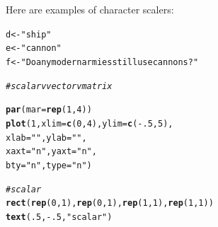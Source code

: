 \documentclass{tufte-book}\usepackage[]{graphicx}\usepackage[]{color}
\makeatletter
\newcommand{\hlnum}[1]{\textcolor[rgb]{0.686,0.059,0.569}{#1}}%
\newcommand{\hlstr}[1]{\textcolor[rgb]{0.192,0.494,0.8}{#1}}%
\newcommand{\hlcom}[1]{\textcolor[rgb]{0.678,0.584,0.686}{\textit{#1}}}%
\newcommand{\hlopt}[1]{\textcolor[rgb]{0,0,0}{#1}}%
\newcommand{\hlstd}[1]{\textcolor[rgb]{0.345,0.345,0.345}{#1}}%
\newcommand{\hlkwb}[1]{\textcolor[rgb]{0.69,0.353,0.396}{#1}}%
\newcommand{\hlkwc}[1]{\textcolor[rgb]{0.333,0.667,0.333}{#1}}%
\newcommand{\hlkwd}[1]{\textcolor[rgb]{0.737,0.353,0.396}{\textbf{#1}}}%
\newenvironment{kframe}{%
 \def\at@end@of@kframe{}%
 \ifinner\ifhmode%
  \def\at@end@of@kframe{\end{minipage}}%
  \begin{minipage}{\columnwidth}%
 \fi\fi%
 \def\FrameCommand##1{\hskip\@totalleftmargin \hskip-\fboxsep
 \colorbox{shadecolor}{##1}\hskip-\fboxsep
     \hskip-\linewidth \hskip-\@totalleftmargin \hskip\columnwidth}%
 \MakeFramed {\advance\hsize-\width
   \@totalleftmargin\z@ \linewidth\hsize
   \@setminipage}}%
 {\par\unskip\endMakeFramed%
 \at@end@of@kframe}
\newenvironment{knitrout}{}{} %
\makeatother
\begin{document}
Here are examples of character scalers:

\begin{knitrout}
\color{fgcolor}\begin{kframe}
\begin{alltt}
\hlstd{d} \hlkwb{<-} \hlstr{"ship"}
\hlstd{e} \hlkwb{<-} \hlstr{"cannon"}
\hlstd{f} \hlkwb{<-} \hlstr{"Do any modern armies still use cannons?"}
\end{alltt}
\end{kframe}
\end{knitrout}

\begin{marginfigure}
\begin{tiny}
\begin{knitrout}
\color{fgcolor}\begin{kframe}
\begin{alltt}
\hlcom{# scalar v vector v matrix}

\hlkwd{par}\hlstd{(}\hlkwc{mar} \hlstd{=} \hlkwd{rep}\hlstd{(}\hlnum{1}\hlstd{,} \hlnum{4}\hlstd{))}
\hlkwd{plot}\hlstd{(}\hlnum{1}\hlstd{,} \hlkwc{xlim} \hlstd{=} \hlkwd{c}\hlstd{(}\hlnum{0}\hlstd{,} \hlnum{4}\hlstd{),} \hlkwc{ylim} \hlstd{=} \hlkwd{c}\hlstd{(}\hlopt{-}\hlnum{.5}\hlstd{,} \hlnum{5}\hlstd{),}
     \hlkwc{xlab} \hlstd{=} \hlstr{""}\hlstd{,} \hlkwc{ylab} \hlstd{=} \hlstr{""}\hlstd{,}
     \hlkwc{xaxt} \hlstd{=} \hlstr{"n"}\hlstd{,} \hlkwc{yaxt} \hlstd{=} \hlstr{"n"}\hlstd{,}
     \hlkwc{bty} \hlstd{=} \hlstr{"n"}\hlstd{,} \hlkwc{type} \hlstd{=} \hlstr{"n"}\hlstd{)}

\hlcom{# scalar}
\hlkwd{rect}\hlstd{(}\hlkwd{rep}\hlstd{(}\hlnum{0}\hlstd{,} \hlnum{1}\hlstd{),} \hlkwd{rep}\hlstd{(}\hlnum{0}\hlstd{,} \hlnum{1}\hlstd{),} \hlkwd{rep}\hlstd{(}\hlnum{1}\hlstd{,} \hlnum{1}\hlstd{),} \hlkwd{rep}\hlstd{(}\hlnum{1}\hlstd{,} \hlnum{1}\hlstd{))}
\hlkwd{text}\hlstd{(}\hlnum{.5}\hlstd{,} \hlopt{-}\hlnum{.5}\hlstd{,} \hlstr{"scalar"}\hlstd{)}


\end{alltt}
\end{kframe}
\end{knitrout}
\end{tiny}
\end{marginfigure}
\end{document}
